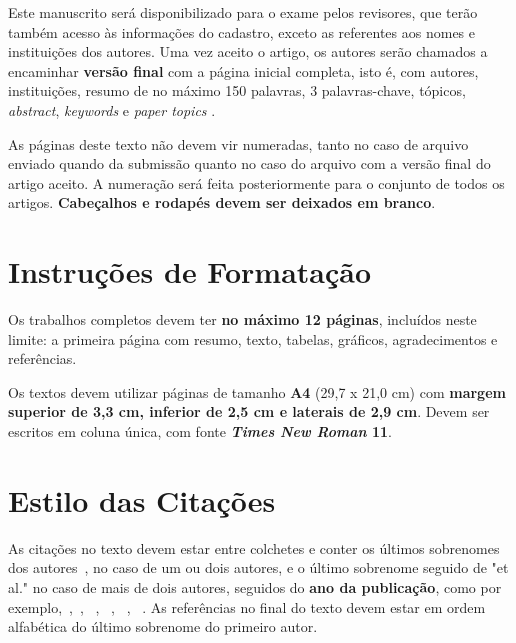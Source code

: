 \documentclass[a4paper,11pt]{article}
\begin{document}
Este manuscrito ser\'a disponibilizado para o exame pelos revisores, que ter\~ao tamb\'em acesso
 \`as informa\c c\~oes do cadastro, exceto as referentes aos nomes e institui\c c\~oes dos autores. 
Uma vez aceito o artigo, os autores ser\~ao chamados a encaminhar \textbf{vers\~ao final} com a p\'agina inicial completa, isto \'e, com autores, institui\c c\~oes, resumo de no m\'aximo 150 palavras, 3 palavras-chave, t\'opicos, \textit{abstract}, \textit{keywords} e \textit{paper topics} .

As p\'aginas deste texto n\~ao devem vir numeradas, tanto no caso de arquivo enviado quando da submiss\~ao quanto no caso do arquivo com a vers\~ao final do artigo aceito. 
A numera\c c\~ao ser\'a feita posteriormente para o conjunto de todos os artigos.
\textbf{Cabe\c calhos e rodap\'es devem ser deixados em branco}.


\section{ Instru\c c\~oes de Formata\c c\~ao}


Os trabalhos completos devem ter \textbf{no m\'aximo 12 p\'aginas}, inclu\'idos neste limite: a primeira p\'agina com resumo, texto, tabelas, gr\'aficos, agradecimentos e refer\^encias.

Os textos devem utilizar p\'aginas de tamanho \textbf{A4} (29,7 x 21,0 cm) com \textbf{margem superior de 3,3 cm, inferior de 2,5 cm e laterais de 2,9 cm}.
 Devem ser escritos em coluna \'unica, com fonte \textbf{\textit{Times New Roman} 11}. 



\section{ Estilo das Cita\c c\~oes}


As cita\c c\~oes no texto devem estar entre colchetes e conter  os \'ultimos sobrenomes dos autores~\citep{silva:99}, no caso de um ou dois autores, e o \'ultimo sobrenome seguido de "et al." no caso de mais de dois autores, seguidos do \textbf{ano da publica\c c\~ao}, como por exemplo,~\citep{anna:06},~\citep{gates:03}, ~\citep{smith:02}, ~\citep{silva:99}, ~\citep{pele:04}, ~\citep{web:16}.
As refer\^encias no final do texto devem estar em ordem alfab\'etica do \'ultimo sobrenome do primeiro autor. 


~\\


\end{document}

